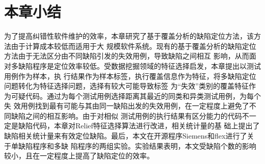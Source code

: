 \section{本章小结}
为了提高纠错性软件维护的效率，本章研究了基于覆盖分析的缺陷定位方法，该方法由于计算成本较低而适用于大
规模软件系统。现有的基于覆盖分析的缺陷定位方法由于无法区分由不同缺陷引发的失效用例，导致缺陷之间相互
影响，从而面对多缺陷程序是定位效率较低。受数据挖掘领域的特征选择启发，本章提出以测试用例作为样本，执
行结果作为样本标签，执行覆盖信息作为特征，将多缺陷定位问题转化为特征选择问题，选择有较大可能导致标签
为``失效''类别的覆盖特征作为可疑代码。通过为每个测试用例选择距离其最近的同类和异类测试用例，为每个失
效用例找到最有可能与其由同一缺陷出发的失效用例，在一定程度上避免了不同缺陷之间的相互影响。由于对相似
测试用例的执行结果有区分能力的代码不一定是缺陷代码，本章对Relief特征选择算法进行改进，相关统计量的基
础上提出了缺陷相关统计量来有效定位缺陷。最后，本文在开源程序Siemens和flex进行了关于单缺陷程序和多缺
陷程序的两组实验。实验结果表明，本文受缺陷个数的影响较小，且在一定程度上提高了缺陷定位的效率。





